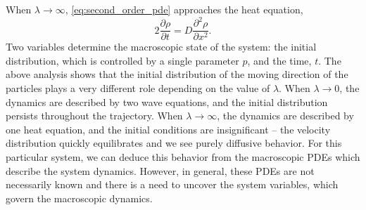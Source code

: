 \documentclass[prl, reprint, final, showkeys]{revtex4-1}
\begin{document}
When $\lambda \rightarrow \infty$, \eqref{eq:second_order_pde} approaches the heat equation,
\begin{equation}
2 \frac{\partial \rho}{\partial t} = D \frac{\partial ^2 \rho}{\partial x^2}.
\end{equation}
%
Two variables determine the macroscopic state of the system: the initial distribution, which is controlled by a single parameter $p$, and the time, $t$.
%
The above analysis shows that the initial distribution of the moving direction of the particles plays a very different role depending on the value of $\lambda$.
%
When $\lambda \rightarrow 0$, the dynamics are described by two wave equations, and the initial distribution persists throughout the trajectory.
%
When $\lambda \rightarrow \infty$, the dynamics are described by one heat equation, and the initial conditions are insignificant -- the velocity distribution quickly equilibrates and we see purely diffusive behavior.
%
For this particular system, we can deduce this behavior from the macroscopic PDEs which describe the system dynamics.
%
However, in general, these PDEs are not necessarily known and there is a need to uncover the system variables, which govern the macroscopic dynamics.
\end{document}
